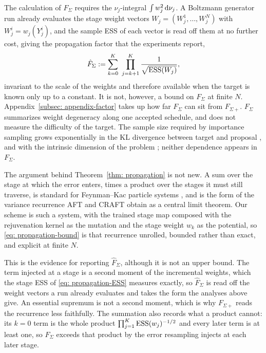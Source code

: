 \documentclass{article}
\begin{document}
The calculation of $F_\Sigma$ requires the $\nu_j$-integral $\int w_j^2 \, \mathrm{d}\nu_j$. A Boltzmann generator run already evaluates the stage weight vectors $W_j = (W_j^1,\dots,W_j^N)$ with $W_j^i = w_j(Y_j^i)$, and the sample ESS of each vector is read off them at no further cost, giving the propagation factor that the experiments report,
\begin{equation}
    \hat F_{\Sigma} := \sum_{k=0}^{K}\ \prod_{j=k+1}^{K} \frac{1}{\sqrt{\ESS(W_j)}} ,
    \label{eq: propagation-factor-hat}
\end{equation}
invariant to the scale of the weights and therefore available when the target is known only up to a constant. It is not, however, a bound on $F_\Sigma$ at finite $N$. Appendix~\ref{subsec: appendix-factor} takes up how far $F_\Sigma$ can sit from $F_{\Sigma+}$.
$F_\Sigma$ summarizes weight degeneracy along one accepted schedule, and does not measure the difficulty of the target. The sample size required by importance sampling grows exponentially in the KL divergence between target and proposal \citep{chatterjee2018sample}, and with the intrinsic dimension of the problem \citep{agapiou2017importance}; neither dependence appears in $F_\Sigma$.

{\color{blue}The argument behind Theorem~\ref{thm: propagation} is not new. A sum over the stage at which the error enters, times a product over the stages it must still traverse, is standard for Feynman--Kac particle systems \citep{delmoral2004feynman,chopin2020introduction}, and is the form of the variance recurrence AFT \citep{arbel2021annealed} and CRAFT \citep{matthews2022craft} obtain as a central limit theorem. Our scheme is such a system, with the trained stage map composed with the rejuvenation kernel as the mutation and the stage weight $w_k$ as the potential, so \eqref{eq: propagation-bound} is that recurrence unrolled, bounded rather than exact, and explicit at finite $N$.}

{\color{blue}This is the evidence for reporting $\hat F_\Sigma$, although it is not an upper bound. The term injected at a stage is a second moment of the incremental weights, which the stage ESS of \eqref{eq: propagation-ESS} measures exactly, so $\hat F_\Sigma$ is read off the weight vectors a run already evaluates and takes the form the analyses above give. An essential supremum is not a second moment, which is why $F_{\Sigma+}$ reads the recurrence less faithfully. The summation also records what a product cannot: its $k=0$ term is the whole product $\prod_{j=1}^{K}\mathrm{ESS}(w_j)^{-1/2}$ and every later term is at least one, so $F_\Sigma$ exceeds that product by the error resampling injects at each later stage.}
\end{document}
